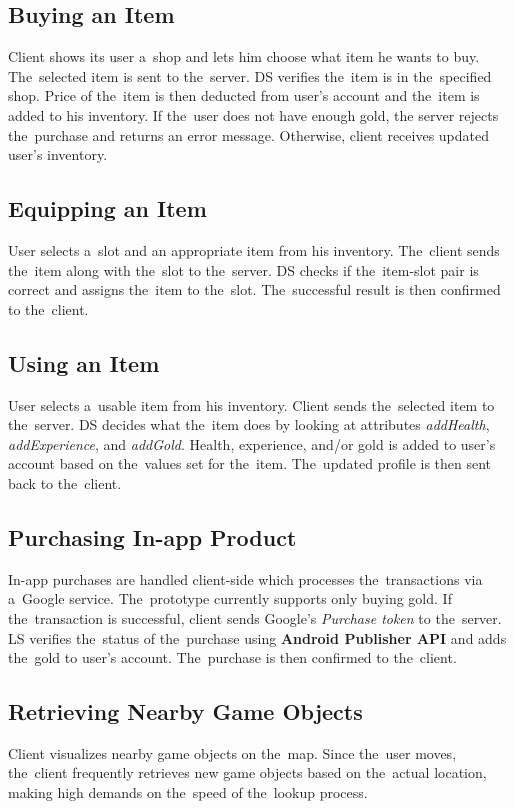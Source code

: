 	\subsection{Buying an Item}
	Client shows its user a~shop and lets him choose what item he wants to buy. The~selected item is sent to the~server. DS verifies the~item is in the~specified shop. Price of the~item is then deducted from user's account and the~item is added to his inventory. If the~user does not have enough gold, the server rejects the~purchase and returns an error message. Otherwise, client receives updated user's inventory.
	
	\subsection{Equipping an Item}
	User selects a~slot and an appropriate item from his inventory. The~client sends the~item along with the~slot to the~server. DS checks if the~item-slot pair is correct and assigns the~item to the~slot. The~successful result is then confirmed to the~client.
	
	\subsection{Using an Item}
	User selects a~usable item from his inventory. Client sends the~selected item to the~server. DS decides what the~item does by looking at attributes \textit{addHealth}, \textit{addExperience}, and \textit{addGold}. Health, experience, and/or gold is added to user's account based on the~values set for the~item. The~updated profile is then sent back to the~client.
		
	\subsection{Purchasing In-app Product}
	In-app purchases are handled client-side which processes the~transactions via a~Google service. The~prototype currently supports only buying gold. If the~transaction is successful, client sends Google's \textit{Purchase token} to the~server. LS verifies the~status of the~purchase using \textbf{Android Publisher API} \cite{androidpublisher} and adds the~gold to user's account. The~purchase is then confirmed to the~client.

	\subsection{Retrieving Nearby Game Objects}
	Client visualizes nearby game objects on the~map. Since the~user moves, the~client frequently retrieves new game objects based on the~actual location, making high demands on the~speed of the~lookup process.
	
